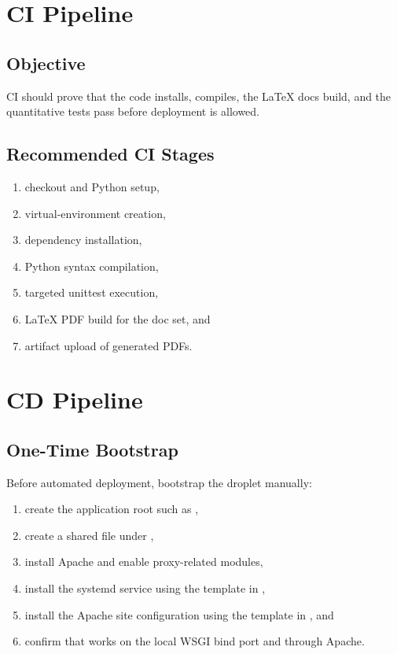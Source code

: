 \documentclass[11pt]{article}
\begin{document}
\section{CI Pipeline}
\subsection{Objective}
CI should prove that the code installs, compiles, the LaTeX docs build, and the quantitative tests pass before deployment is allowed.

\subsection{Recommended CI Stages}
\begin{enumerate}[leftmargin=1.5em]
    \item checkout and Python setup,
    \item virtual-environment creation,
    \item dependency installation,
    \item Python syntax compilation,
    \item targeted unittest execution,
    \item LaTeX PDF build for the doc set, and
    \item artifact upload of generated PDFs.
\end{enumerate}

\section{CD Pipeline}
\subsection{One-Time Bootstrap}
Before automated deployment, bootstrap the droplet manually:
\begin{enumerate}[leftmargin=1.5em]
    \item create the application root such as ,
    \item create a shared  file under ,
    \item install Apache and enable proxy-related modules,
    \item install the systemd service using the template in ,
    \item install the Apache site configuration using the template in , and
    \item confirm that  works on the local WSGI bind port and through Apache.
\end{enumerate}
\end{document}

